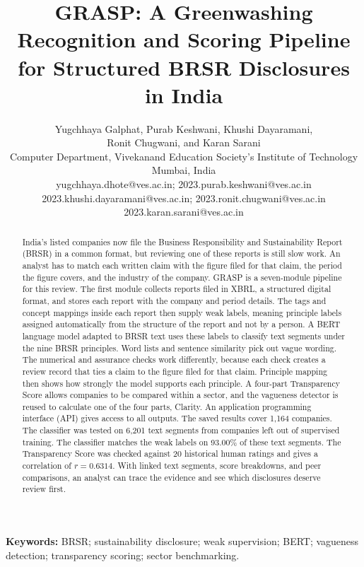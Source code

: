 \documentclass[11pt,a4paper,onecolumn]{article}
\title{\textbf{GRASP: A Greenwashing Recognition and Scoring Pipeline\\for Structured BRSR Disclosures in India}}
\author{\normalsize Yugchhaya Galphat, Purab Keshwani, Khushi Dayaramani,\\
\normalsize Ronit Chugwani, and Karan Sarani\\[5pt]
\small Computer Department, Vivekanand Education Society's Institute of Technology\\
\small Mumbai, India\\[3pt]
\footnotesize yugchhaya.dhote@ves.ac.in; 2023.purab.keshwani@ves.ac.in\\
\footnotesize 2023.khushi.dayaramani@ves.ac.in; 2023.ronit.chugwani@ves.ac.in\\
\footnotesize 2023.karan.sarani@ves.ac.in}
\date{}
\begin{document}
\maketitle
\begin{abstract}
India's listed companies now file the Business Responsibility and Sustainability Report (BRSR) in a common format, but reviewing one of these reports is still slow work. An analyst has to match each written claim with the figure filed for that claim, the period the figure covers, and the industry of the company. GRASP is a seven-module pipeline for this review. The first module collects reports filed in XBRL, a structured digital format, and stores each report with the company and period details. The tags and concept mappings inside each report then supply weak labels, meaning principle labels assigned automatically from the structure of the report and not by a person. A BERT language model adapted to BRSR text uses these labels to classify text segments under the nine BRSR principles. Word lists and sentence similarity pick out vague wording. The numerical and assurance checks work differently, because each check creates a review record that ties a claim to the figure filed for that claim. Principle mapping then shows how strongly the model supports each principle. A four-part Transparency Score allows companies to be compared within a sector, and the vagueness detector is reused to calculate one of the four parts, Clarity. An application programming interface (API) gives access to all outputs. The saved results cover 1,164 companies. The classifier was tested on 6,201 text segments from companies left out of supervised training. The classifier matches the weak labels on 93.00\% of these text segments. The Transparency Score was checked against 20 historical human ratings and gives a correlation of $r=0.6314$. With linked text segments, score breakdowns, and peer comparisons, an analyst can trace the evidence and see which disclosures deserve review first.
\end{abstract}
\noindent\textbf{Keywords:} BRSR; sustainability disclosure; weak supervision; BERT; vagueness detection; transparency scoring; sector benchmarking.









\end{document}
